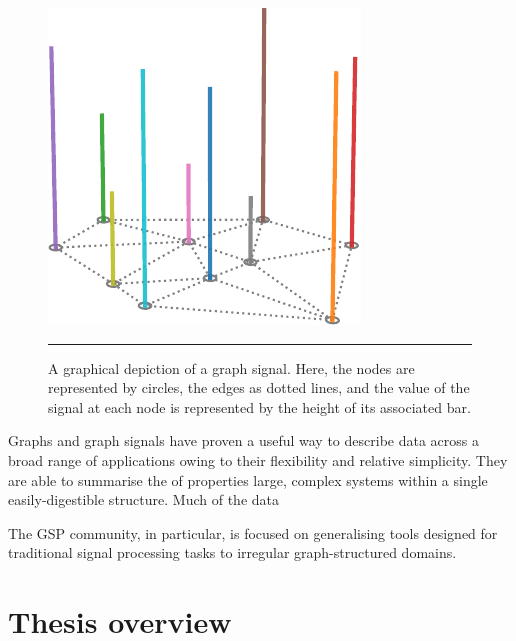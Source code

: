 \begin{figure}[htbp]
	\centering
		\includegraphics[width=0.4\linewidth]{Figures/graph_signal_cropped.pdf}
		\rule{35em}{0.5pt}
	\caption{A graphical depiction of a graph signal. Here, the nodes are represented by circles, the edges as dotted lines, and the value of the signal at each node is represented by the height of its associated bar. }
	\label{fig:graph_signal}
\end{figure}


Graphs and graph signals have proven a useful way to describe data across a broad range of applications owing to their flexibility and relative simplicity. They are able to summarise the of properties large, complex systems within a single easily-digestible structure. Much of the data 


The GSP community, in particular, is focused on generalising tools designed for traditional signal processing tasks to irregular graph-structured domains. 

\citep{Ortega2018}



\section{Thesis overview}